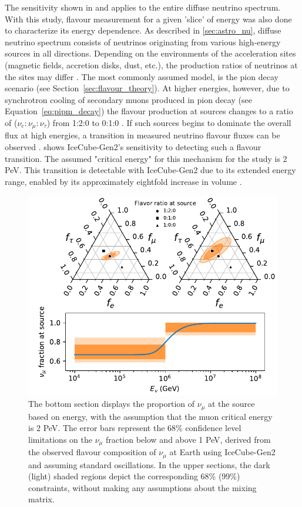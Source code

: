 The sensitivity shown in  and applies to the entire diffuse neutrino spectrum. With this study, flavour measurement for a given 'slice' of energy was also done to characterize its energy dependence. As described in \ref{sec:astro_nu}, diffuse neutrino spectrum consists of neutrinos originating from various high-energy sources in all directions. Depending on the environments of the acceleration sites (magnetic fields, accretion disks, dust, etc.), the production ratios of neutrinos at the sites may differ . The most commonly assumed model, is the pion decay scenario (see Section~\ref{sec:flavour_theory}). At higher energies, however, due to synchrotron cooling of secondary muons produced in pion decay (see Equation~\ref{eq:pipm_decay}) the flavour production at sources changes to a ratio of ($\nu_e:\nu_{\mu}:\nu_{\tau}$) from 1:2:0 to 0:1:0 . If such sources begins to dominate the overall flux at high energies, a transition in measured neutrino flavour fluxes can be observed .  shows IceCube-Gen2's sensitivity to detecting such a flavour transition. The assumed "critical energy" for this mechanism for the study is 2 PeV. This transition is detectable with IceCube-Gen2 due to its extended energy range, enabled by its approximately eightfold increase in volume .

\begin{figure}[h!]
\centering
    \includegraphics{./figures/gen2/MuonDamped.pdf}
    \caption{The bottom section displays the proportion of $\nu_{\mu}$ at the source based on energy, with the assumption that the muon critical energy is 2 PeV. The error bars represent the 68\% confidence level limitations on the $\nu_{\mu}$ fraction below and above 1 PeV, derived from the observed flavour composition of $\nu_{\mu}$ at Earth using IceCube-Gen2 and assuming standard oscillations. In the upper sections, the dark (light) shaded regions depict the corresponding 68\% (99\%) constraints, without making any assumptions about the mixing matrix.}
\end{figure}

